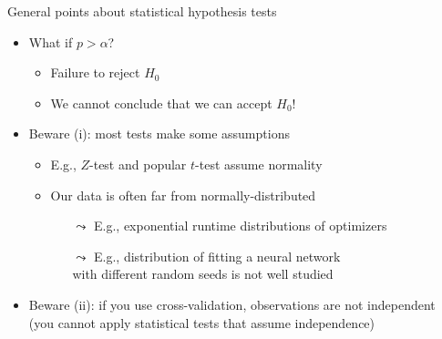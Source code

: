 	\begin{frame}[c]{General points about statistical hypothesis tests}
		
		\begin{itemize}
			\item What if $p > \alpha$?
			\begin{itemize}
				\item \alert{Failure to reject $H_0$}
				\item \alert{We cannot conclude that we can accept $H_0$!}
			\end{itemize}
			
			
			\pause
			\bigskip
			\item Beware (i): most tests make some assumptions
			\begin{itemize}
				\item E.g., $Z$-test and popular $t$-test assume \alert{normality}
				\item Our data is often far from normally-distributed
				\begin{itemize}
					\item[$\leadsto$] E.g., exponential runtime distributions of optimizers
					\item[$\leadsto$] E.g., distribution of fitting a neural network\\ with different random seeds is not well studied
				\end{itemize}
			\end{itemize}
			\medskip
			\pause
			\item Beware (ii): if you use cross-validation, observations are not independent\\ (you cannot apply statistical tests that assume independence)
		\end{itemize}
		
	\end{frame}

	

